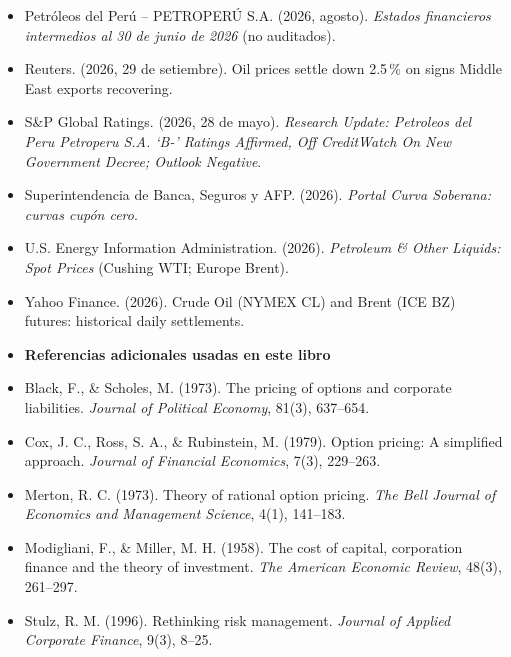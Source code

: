 \begin{itemize}[leftmargin=1em,itemsep=4pt]
\item Petróleos del Perú -- PETROPERÚ S.A. (2026, agosto). \emph{Estados financieros intermedios al 30 de junio de 2026} (no auditados).
\item Reuters. (2026, 29 de setiembre). Oil prices settle down 2.5\,\% on signs Middle East exports recovering.
\item S\&P Global Ratings. (2026, 28 de mayo). \emph{Research Update: Petroleos del Peru Petroperu S.A. `B-' Ratings Affirmed, Off CreditWatch On New Government Decree; Outlook Negative}.
\item Superintendencia de Banca, Seguros y AFP. (2026). \emph{Portal Curva Soberana: curvas cupón cero}.
\item U.S. Energy Information Administration. (2026). \emph{Petroleum \& Other Liquids: Spot Prices} (Cushing WTI; Europe Brent).
\item Yahoo Finance. (2026). Crude Oil (NYMEX CL) and Brent (ICE BZ) futures: historical daily settlements.

\item[] \textbf{Referencias adicionales usadas en este libro}
\item Black, F., \& Scholes, M. (1973). The pricing of options and corporate liabilities. \emph{Journal of Political Economy}, 81(3), 637--654.
\item Cox, J. C., Ross, S. A., \& Rubinstein, M. (1979). Option pricing: A simplified approach. \emph{Journal of Financial Economics}, 7(3), 229--263.
\item Merton, R. C. (1973). Theory of rational option pricing. \emph{The Bell Journal of Economics and Management Science}, 4(1), 141--183.
\item Modigliani, F., \& Miller, M. H. (1958). The cost of capital, corporation finance and the theory of investment. \emph{The American Economic Review}, 48(3), 261--297.
\item Stulz, R. M. (1996). Rethinking risk management. \emph{Journal of Applied Corporate Finance}, 9(3), 8--25.
\end{itemize}
